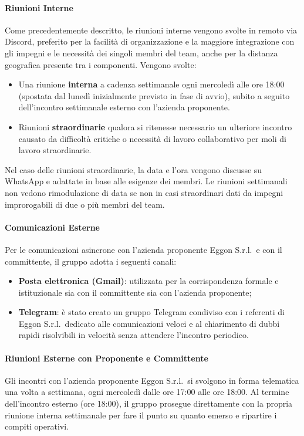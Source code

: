 \documentclass[documento]{gpt}
\begin{document}
	\paragraph{Riunioni Interne}
	Come precedentemente descritto, le riunioni interne vengono svolte in remoto via Discord, preferito per la facilità di organizzazione e la maggiore integrazione con gli impegni e le necessità dei singoli membri del team, anche per la distanza geografica presente tra i componenti.
	Vengono svolte:
	\begin{itemize}
		\item Una riunione \textbf{interna} a cadenza settimanale ogni mercoledì alle ore 18:00 (spostata dal lunedì inizialmente previsto in fase di avvio), subito a seguito dell'incontro settimanale esterno con l'azienda proponente.
		\item Riunioni \textbf{straordinarie} qualora si ritenesse necessario un ulteriore incontro causato da difficoltà critiche o necessità di lavoro collaborativo per moli di lavoro straordinarie.
	\end{itemize}
	Nel caso delle riunioni straordinarie, la data e l'ora vengono discusse su WhatsApp e adattate in base alle esigenze dei membri. Le riunioni settimanali non vedono rimodulazione di data se non in casi straordinari dati da impegni improrogabili di due o più membri del team.
	\paragraph{Comunicazioni Esterne}
	Per le comunicazioni asincrone con l'azienda proponente Eggon S.r.l.\ e con il committente, il gruppo adotta i seguenti canali:
	\begin{itemize}
		\item \textbf{Posta elettronica (Gmail)}: utilizzata per la corrispondenza formale e istituzionale sia con il committente sia con l'azienda proponente;
		\item \textbf{Telegram}: è stato creato un gruppo Telegram condiviso con i referenti di Eggon S.r.l.\ dedicato alle comunicazioni veloci e al chiarimento di dubbi rapidi risolvibili in velocità senza attendere l'incontro periodico.
	\end{itemize}
	\paragraph{Riunioni Esterne con Proponente e Committente}
	Gli incontri con l'azienda proponente Eggon S.r.l.\ si svolgono in forma telematica una volta a settimana, ogni mercoledì dalle ore 17:00 alle ore 18:00. Al termine dell'incontro esterno (ore 18:00), il gruppo prosegue direttamente con la propria riunione interna settimanale per fare il punto su quanto emerso e ripartire i compiti operativi.
\end{document}
